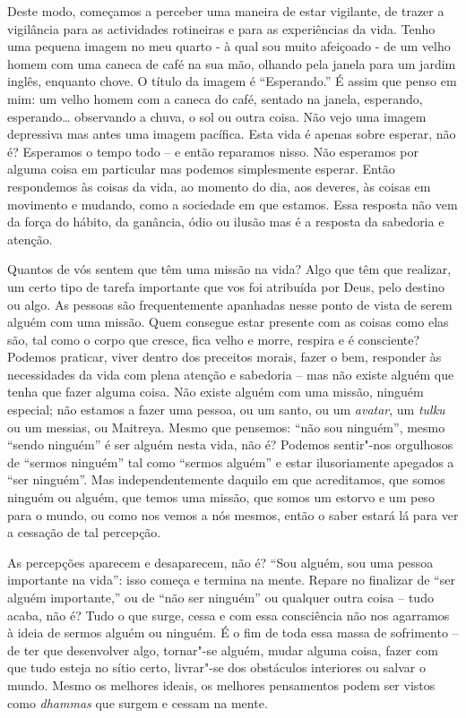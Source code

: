Deste modo, começamos a perceber uma maneira de estar vigilante, de
trazer a vigilância para as actividades rotineiras e para as
experiências da vida. Tenho uma pequena imagem no meu quarto - à qual
sou muito afeiçoado - de um velho homem com uma caneca de café na sua
mão, olhando pela janela para um jardim inglês, enquanto chove. O título
da imagem é ``Esperando.'' É assim que penso em mim: um velho homem com
a caneca do café, sentado na janela, esperando, esperando\ldots{} observando
a chuva, o sol ou outra coisa. Não vejo uma imagem depressiva mas antes
uma imagem pacífica. Esta vida é apenas sobre esperar, não é? Esperamos
o tempo todo -- e então reparamos nisso. Não esperamos por alguma coisa
em particular  mas podemos simplesmente esperar. Então respondemos às
coisas da vida, ao momento do dia, aos deveres, às coisas em movimento e
mudando, como a sociedade em que estamos. Essa resposta não vem da força
do hábito, da ganância, ódio ou ilusão mas é a resposta da sabedoria e
atenção.

Quantos de vós sentem que têm uma missão na vida? Algo que têm que
realizar, um certo tipo de tarefa importante que vos foi atribuída por
Deus, pelo destino ou algo. As pessoas são frequentemente apanhadas
nesse ponto de vista de serem alguém com uma missão. Quem consegue estar
presente com as coisas como elas são, tal como o corpo que cresce, fica
velho e morre, respira e é consciente? Podemos praticar, viver dentro
dos preceitos morais, fazer o bem, responder às necessidades da vida com
plena atenção e sabedoria -- mas não existe alguém que tenha que fazer
alguma coisa. Não existe alguém com uma missão, ninguém especial; não
estamos a fazer uma pessoa, ou um santo, ou um \emph{avatar}, um
\emph{tulku} ou um messias, ou Maitreya. Mesmo que pensemos: ``não sou
ninguém'', mesmo ``sendo ninguém'' é ser alguém nesta vida, não é?
Podemos sentir"-nos orgulhosos de ``sermos ninguém'' tal como ``sermos
alguém'' e estar ilusoriamente apegados a ``ser ninguém''. Mas
independentemente daquilo em que acreditamos, que somos ninguém ou
alguém, que temos uma missão, que somos um estorvo e um peso para o
mundo, ou como nos vemos a nós mesmos, então o saber estará lá para ver
a cessação de tal percepção.

As percepções aparecem e desaparecem, não é? ``Sou alguém, sou uma
pessoa importante na vida'': isso começa e termina na mente. Repare no
finalizar de ``ser alguém importante,'' ou de ``não ser ninguém'' ou
qualquer outra coisa -- tudo acaba, não é? Tudo o que surge, cessa e com
essa consciência não nos agarramos à ideia de sermos alguém ou ninguém.
É o fim de toda essa massa de sofrimento -- de ter que desenvolver algo,
tornar"-se alguém, mudar alguma coisa, fazer com que tudo esteja no sítio
certo, livrar"-se dos obstáculos interiores ou salvar o mundo. Mesmo os
melhores ideais, os melhores pensamentos podem ser vistos como
\emph{dhammas} que surgem e cessam na mente.

